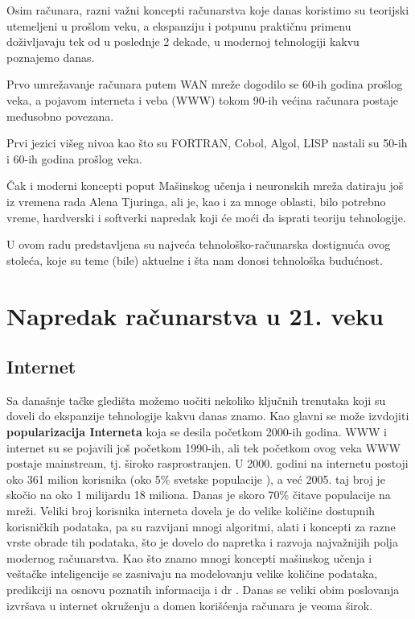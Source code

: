 \documentclass[a4paper]{article}
\begin{document}
{Osim računara, razni važni koncepti računarstva koje danas koristimo su teorijski utemeljeni u prošlom veku, a ekspanziju i potpunu praktičnu primenu doživljavaju tek od u poslednje 2 dekade, u modernoj tehnologiji kakvu poznajemo danas. 

Prvo umrežavanje računara putem WAN mreže dogodilo se 60-ih godina prošlog veka, a pojavom interneta i veba (WWW) tokom 90-ih većina računara postaje međusobno povezana. 

Prvi jezici višeg nivoa kao što su FORTRAN, Cobol, Algol, LISP nastali su 50-ih i 60-ih godina prošlog veka.

Čak i moderni koncepti poput Mašinskog učenja i neuronskih mreža datiraju još iz vremena rada Alena Tjuringa, ali je, kao i za mnoge oblasti, bilo potrebno vreme, hardverski i softverki napredak koji će moći da isprati teoriju tehnologije. 

U ovom radu predstavljena su najveća tehnološko-računarska dostignuća ovog stoleća, koje su teme (bile) aktuelne i šta nam donosi tehnološka budućnost.

\setlength{\parskip}{1em}



\section{Napredak računarstva u 21. veku}
\label{sec:rac_21. vek}
\subsection{Internet}

Sa današnje tačke gledišta možemo uočiti nekoliko ključnih trenutaka koji su doveli do ekspanzije tehnologije kakvu danas znamo. Kao glavni se može izvdojiti {\bf  popularizacija Interneta } koja se desila početkom 2000-ih godina. WWW i internet su se pojavili još početkom 1990-ih, ali tek početkom ovog veka WWW postaje mainstream, tj. široko rasprostranjen. U 2000. godini na internetu postoji oko 361 milion korisnika (oko 5\% svetske populacije ), a već 2005. taj broj je skočio na oko 1 milijardu 18 miliona. Danas je skoro 70\% čitave populacije na mreži. \cite{worldstats} Veliki broj korisnika interneta dovela je do velike količine dostupnih korisničkih podataka, pa su razvijani mnogi algoritmi, alati i koncepti za razne vrste obrade tih podataka, što je dovelo do napretka i razvoja najvažnijih polja modernog računarstva. Kao što znamo mnogi koncepti mašinskog učenja i veštačke inteligencije se zasnivaju na modelovanju velike količine podataka, predikciji na osnovu poznatih informacija i dr .
Danas se veliki obim poslovanja izvršava u internet okruženju a domen korišćenja računara je veoma širok.
}
\end{document}
